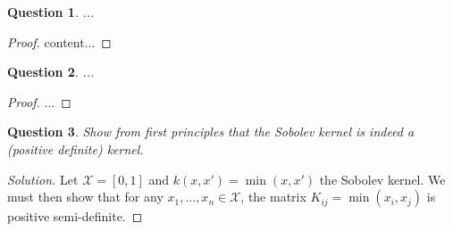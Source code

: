 \documentclass{article}
\theoremstyle{plain}
\newtheorem{question}{Question}
\theoremstyle{remark}
\newenvironment{solution}{\begin{proof}[Solution]\renewcommand\qedsymbol{}}{\end{proof}}
\newcommand{\Cal}{\mathcal}
\newcommand\XX{\Cal X}
\begin{document}
\begin{question}
	...
\end{question}

\begin{proof}
	content...
\end{proof}

\begin{question}
	...
\end{question}

\begin{proof}
	...
\end{proof}

\begin{question}
	Show from first principles that the Sobolev kernel is indeed a (positive definite) kernel.
\end{question}

\begin{solution}
	Let $\XX = [0, 1]$ and $k(x, x') = \min(x, x')$ the Sobolev kernel. We must then show that for any $x_1, \dotsc, x_n \in \XX$, the matrix $K_{ij} = \min(x_i, x_j)$ is positive semi-definite. 
\end{solution}
\end{document}

